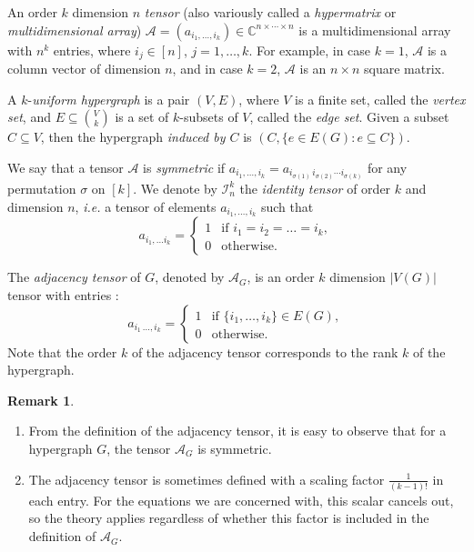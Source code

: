 \documentclass[12pt]{article}
\numberwithin{equation}{section}
\theoremstyle{definition}
\newtheorem{remark}{Remark}
\newcommand{\ev}[1]{( #1 )}
\begin{document}
An order $k$ dimension $n$ \emph{tensor} (also variously called a \emph{hypermatrix} or \emph{multidimensional array}) $\mathcal{A}=(a_{i_1, \ldots, i_k}) \in \mathbb{C}^{n\times \cdots \times n}$ is a multidimensional array with $n^k$ entries, where $i_j \in [n]$, $j=1,\ldots, k$. For example, in case $k=1$, $\mathcal{A}$ is a column vector of dimension $n$, and in case $k=2$, $\mathcal{A}$ is an $n\times n$ square matrix.

A $k$-\emph{uniform hypergraph} is a pair $\ev{V,E}$, where $V$ is a finite set, called the \textit{vertex set}, and $E \subseteq \binom{V}{k}$ is a set of $k$-subsets of $V$, called the \textit{edge set}. Given a subset $C\subseteq V$, then the hypergraph \textit{induced by $C$} is $\ev{C,\{e\in E\ev{G}: e\subseteq C\}}$.



We say that a tensor $\mathcal{A}$ is \emph{symmetric} if $a_{i_1, \ldots, i_k} = a_{i_{\sigma{(1)}}\,i_{\sigma{(2)}}\cdots i_{\sigma{(k)}}}$ for any permutation $\sigma$ on $[k]$. We denote by $\mathcal{I}^k_n$ the \emph{identity tensor} of order $k$ and dimension $n$, \emph{i.e.} a tensor of elements $a_{i_1, \ldots, i_k}$ such that
$$a_{i_1, \ldots i_k}=\begin{cases}
1 & \text{if } i_1=i_2=\ldots =i_k,\\
0 & \text{otherwise}.
\end{cases}$$

The \emph{adjacency tensor} of $G$, denoted by $\mathcal{A}_G$, is an order $k$ dimension $|V(G)|$ tensor with entries \cite{C2012}:
$$ a_{i_1\, \ldots, i_{k}}=\begin{cases}
1 & \text{if } \{i_1, \ldots, i_k \}\in E(G), \\
0 & \text{otherwise.}
\end{cases}$$
Note that the order $k$ of the adjacency tensor corresponds to the rank $k$ of the hypergraph.

\begin{remark}\leavevmode
\label{rmk:symmetry_normalizing} 
\begin{enumerate}
\item[\textit{i)}] From the definition of the adjacency tensor, it is easy to observe that for a hypergraph $G$, the tensor $\mathcal{A}_G$ is symmetric.
\item[\textit{ii)}] The adjacency tensor is sometimes defined with a scaling factor $\frac1{\ev{k-1}!}$ in each entry. For the equations we are concerned with, this scalar cancels out, so the theory applies regardless of whether this factor is included in the definition of $\mathcal{A}_G$. 
\end{enumerate}
\end{remark}
\end{document}
